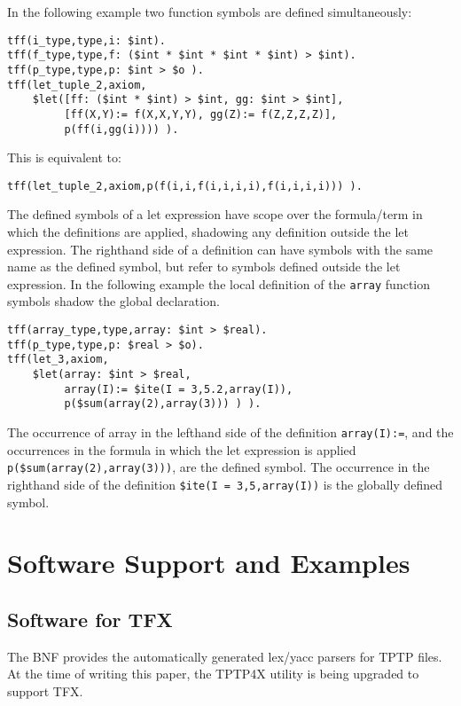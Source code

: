 \documentclass{easychair}
\begin{document}
In the following example two function symbols are defined simultaneously:
\begin{verbatim}
tff(i_type,type,i: $int).
tff(f_type,type,f: ($int * $int * $int * $int) > $int).
tff(p_type,type,p: $int > $o ).
tff(let_tuple_2,axiom,
    $let([ff: ($int * $int) > $int, gg: $int > $int],
         [ff(X,Y):= f(X,X,Y,Y), gg(Z):= f(Z,Z,Z,Z)],
         p(ff(i,gg(i)))) ).
\end{verbatim}
This is equivalent to:
\begin{verbatim}
tff(let_tuple_2,axiom,p(f(i,i,f(i,i,i,i),f(i,i,i,i))) ).
\end{verbatim}

The defined symbols of a let expression have scope over the formula/term in 
which the definitions are applied, shadowing any definition outside the let 
expression. 
The righthand side of a definition can have symbols with the same name as 
the defined symbol, but refer to symbols defined outside the let expression. 
In the following example the local definition of the {\tt array} function 
symbols shadow the global declaration.
\begin{verbatim}
tff(array_type,type,array: $int > $real).
tff(p_type,type,p: $real > $o).
tff(let_3,axiom,
    $let(array: $int > $real,
         array(I):= $ite(I = 3,5.2,array(I)),
         p($sum(array(2),array(3))) ) ).
\end{verbatim}

The occurrence of array in the lefthand side of the definition 
{\tt array(I):=}, and the occurrences in the formula in which the let 
expression is applied {\tt p(\$sum(array(2),array(3)))}, are the defined 
symbol. 
The occurrence in the righthand side of the definition 
{\tt \$ite(I = 3,5,array(I))} is the globally defined symbol.

\section{Software Support and Examples}
\label{ImplementationExamples}

\subsection{Software for TFX}
\label{Software}

The BNF provides the automatically generated lex/yacc parsers for TPTP files.
At the time of writing this paper, the TPTP4X utility is being upgraded
to support TFX.
\end{document}
